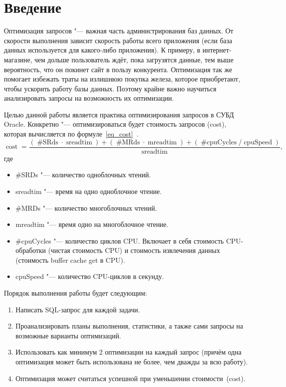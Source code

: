 \chapter*{Введение} %

Оптимизация запросов "--- важная часть администрирования баз данных.
От скорости выполнения зависит скорость работы всего приложения (если база данных используется для какого-либо приложения).
К примеру, в интернет-магазине, чем дольше пользователь ждёт, пока загрузятся данные, тем выше вероятность, что он покинет сайт в пользу конкурента.
Оптимизация так же помогает избежать траты на излишнюю покупка железа, которое приобретают, чтобы ускорить работу базы данных.
Поэтому крайне важно научиться анализировать запросы на возможность их оптимизации.

Целью данной работы является практика оптимизирования запросов в СУБД Oracle.
Конкретно "--- оптимизироваться будет стоимость запросов (cost), которая вычисляется по формуле~\eqref{eq_cost}~\cite{ExplainPlan}.
\begin{equation}\label{eq_cost}%
  \operatorname{cost} = \frac{
    (\operatorname{\#SRds} \cdot \operatorname{sreadtim})
      + (\operatorname{\#MRds} \cdot \operatorname{mreadtim})
      + (\operatorname{\#cpuCycles} / \operatorname{cpuSpeed})
  }{
    \operatorname{sreadtim}
  },
\end{equation}
где
\begin{itemize}%
  \item #SRDs "--- количество одноблочных чтений.
  \item sreadtim "--- время на одно одноблочное чтение.
  \item \#MRDs "--- количество многоблочных чтений.
  \item mreadtim "--- время одно на многоблочное чтение.
  \item \#cpuCycles "--- количество циклов CPU. Включает в себя стоимость CPU-обработки (чистая стоимость CPU) и стоимость извлечения данных (стоимость buffer cache get в CPU).
  \item cpuSpeed "--- количество CPU-циклов в секунду.
\end{itemize}

Порядок выполнения работы будет следующим:
\begin{enumerate}[1.]%
  \item Написать SQL-запрос для каждой задачи.
  \item Проанализировать планы выполнения, статистики, а также сами запросы на возможные варианты оптимизаций.
  \item Использовать как минимум 2 оптимизации на каждый запрос (причём одна оптимизация может быть использована не более, чем дважды за всю работу).
  \item Оптимизация может считаться успешной при уменьшении стоимости~(cost).
\end{enumerate}
